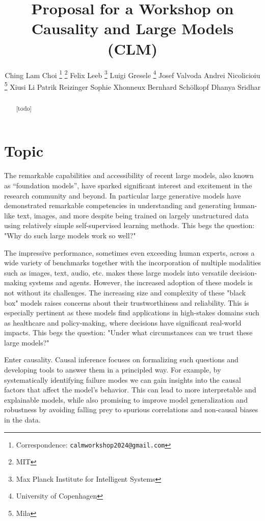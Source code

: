 \documentclass{article}
\title{Proposal for a Workshop on \\
Causality and Large Models (C\emoji{heart}LM)}
\author{%
    Ching Lam Choi \thanks{Correspondence: \texttt{calmworkshop2024@gmail.com}} \thanks{MIT}
    \And
    Felix Leeb \footnotemark[1] \thanks{Max Planck Institute for Intelligent Systems}
    \And
    Luigi Gresele \thanks{University of Copenhagen}
    \And
    Josef Valvoda \footnotemark[4]
    \And
    Andrei Nicolicioiu \thanks{Mila}
    \And
    Xiusi Li \footnotemark[5]
    \And
    Patrik Reizinger \footnotemark[3]
    \And
    Sophie Xhonneux \footnotemark[5]
    \And
    Bernhard Schölkopf \footnotemark[3]
    \And
    Dhanya Sridhar \footnotemark[5]
}
\begin{document}
\maketitle


\begin{abstract}
[todo]
\end{abstract}



\section{Topic}

The remarkable capabilities and accessibility of recent large models, also known as ``foundation models'', have sparked significant interest and excitement in the research community and beyond. In particular large generative models have demonstrated remarkable competencies in understanding and generating human-like text, images, and more despite being trained on largely unstructured data using relatively simple self-supervised learning methods. This begs the question: "Why do such large models work so well?" %

The impressive performance, sometimes even exceeding human experts, across a wide variety of benchmarks together with the incorporation of multiple modalities such as images, text, audio, etc. makes these large models into versatile decision-making systems and agents.
However, the increased adoption of these models is not without its challenges. The increasing size and complexity of these "black box" models raises concerns about their trustworthiness and reliability.
This is especially pertinent as these models find applications in high-stakes domains such as healthcare and policy-making, where decisions have significant real-world impacts.
This begs the question: "Under what circumstances can we trust these large models?" %

Enter causality. Causal inference focuses on formalizing such questions and developing tools to answer them in a principled way. For example, by systematically identifying failure modes 
we can gain insights into the causal factors that affect the model's behavior. 
This can lead to more interpretable and explainable models, while also promising to improve model generalization and robustness by avoiding falling prey to spurious correlations and non-causal biases in the data.
\end{document}
